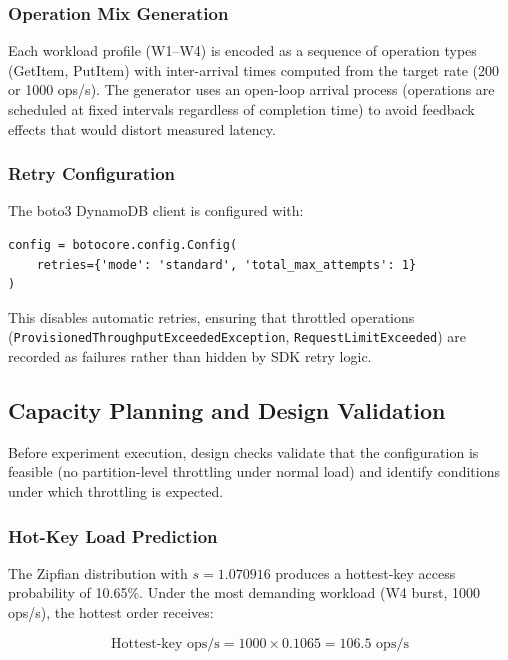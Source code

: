 \subsubsection{Operation Mix Generation}

Each workload profile (W1–W4) is encoded as a sequence of operation types (GetItem, PutItem) with inter-arrival times computed from the target rate (200 or 1000 ops/s). The generator uses an open-loop arrival process (operations are scheduled at fixed intervals regardless of completion time) to avoid feedback effects that would distort measured latency.

\subsubsection{Retry Configuration}

The boto3 DynamoDB client is configured with:

\begin{verbatim}
config = botocore.config.Config(
    retries={'mode': 'standard', 'total_max_attempts': 1}
)
\end{verbatim}

This disables automatic retries, ensuring that throttled operations (\texttt{ProvisionedThroughputExceededException}, \texttt{RequestLimitExceeded}) are recorded as failures rather than hidden by SDK retry logic.

\subsection{Capacity Planning and Design Validation}

Before experiment execution, design checks validate that the configuration is feasible (no partition-level throttling under normal load) and identify conditions under which throttling is expected.

\subsubsection{Hot-Key Load Prediction}

The Zipfian distribution with $s = 1.070916$ produces a hottest-key access probability of 10.65\%. Under the most demanding workload (W4 burst, 1000 ops/s), the hottest order receives:

\begin{equation}
\text{Hottest-key ops/s} = 1000 \times 0.1065 = 106.5 \text{ ops/s}
\end{equation}

